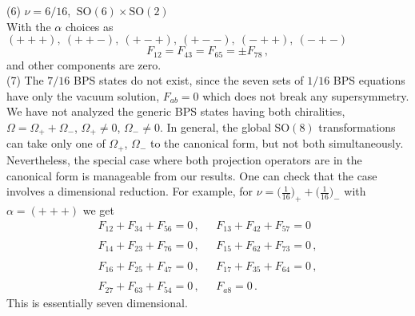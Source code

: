 \documentclass[a4paper,11pt]{article}
\begin{document}
(6) $\nu={6/16}$,  $~\mbox{SO}(6)\times\mbox{SO}(2)$\\
With the $\alpha$ choices as  $(+++),~(++-),~(+-+),~(+--),~(-++),~(-+-)$
\begin{equation}
F_{12}=F_{43}=F_{65}=\pm F_{78}\,, \label{6/16}
\end{equation}
and other components are zero.\\



(7) The  ${7/16}$ BPS states do not exist, since the seven sets of ${1/16}$ BPS equations have only  the vacuum solution,
$F_{ab}=0$ which does not break any supersymmetry.\\


We have not analyzed the generic BPS states having  both chiralities, $\Omega=\Omega_{+}+\Omega_{-}$, $\Omega_{+}\neq 0$, $\Omega_{-}\neq 0$. In
general, the global $\mbox{SO}(8)$ transformations can take only one of $\Omega_{+}$, $\Omega_{-}$ to the canonical form, but not both
simultaneously.  Nevertheless,  the special case where both projection operators are in the canonical form is  manageable from our results. One can
check that the case  involves  a dimensional reduction. For example, for $\nu=\big({\frac{1}{16}}\big)_{+}+\big({\frac{1}{16}}\big)_{-}$ with
$\alpha=(+++)$ we get
\begin{equation}
\begin{array}{ll}
F_{12}+F_{34}+F_{56}=0\,,~&~~F_{13}+F_{42}+F_{57}=0\,\\
{}&{}\\
F_{14}+F_{23}+F_{76}=0\,,~&~~F_{15}+F_{62}+F_{73}=0\,,\\
{}&{}\\
F_{16}+F_{25}+F_{47}=0\,,~&~~F_{17}+F_{35}+F_{64}=0\,,\\
{}&{}\\
F_{27}+F_{63}+F_{54}=0\,,~&~~F_{a8}=0\,.
\end{array}
\end{equation}
This is essentially seven dimensional.








\end{document}
